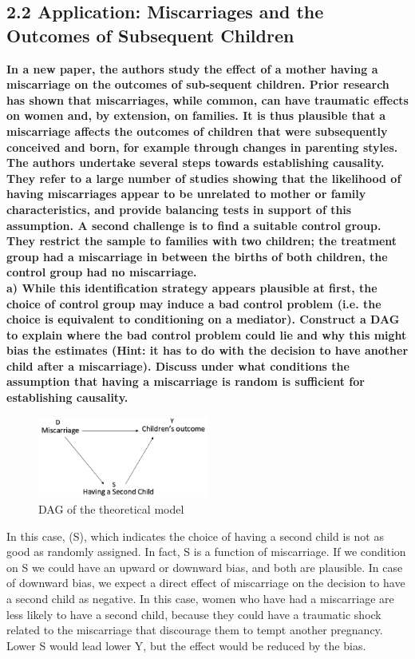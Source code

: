 \documentclass[a4paper,12pt,oneside,English]{article}
\begin{document}
\subsection{2.2  Application: Miscarriages and the Outcomes of Subsequent Children}
\textbf{In a new paper, the authors study the effect of a mother having a miscarriage on the outcomes of sub-sequent children. Prior research has shown that miscarriages, while common, can have traumatic effects on women and, by extension, on families. It is thus plausible that a miscarriage affects the outcomes of children that were subsequently conceived and born, for example through changes in parenting styles.
The authors undertake several steps towards establishing causality. They refer to a large number of studies showing that the likelihood of having miscarriages appear to be unrelated to mother or family characteristics, and provide balancing tests in support of this assumption. A second challenge is to find a suitable control group. They restrict the sample to families with two children; the treatment group had a miscarriage in between the births of both children, the control group had no miscarriage.}\\
\textbf{a) While this identification strategy appears plausible at first, the choice of control group may induce a bad control problem (i.e. the choice is equivalent to conditioning on a mediator). Construct a DAG to explain where the bad control problem could lie and why this might bias the estimates (Hint: it has to do with the decision to have another child after a miscarriage). Discuss under what conditions the assumption that having a miscarriage is random is sufficient for establishing causality.}\\

\begin{figure}[h!]
    \centering
    \includegraphics[width=0.5\textwidth]{Figure 2_2A1.png}
    \caption{DAG of the theoretical model}
    \label{fig 3}
\end{figure}
In this case, (S), which indicates the choice of having a second child is not as good as randomly assigned. In fact, S is a function of miscarriage. If we condition on S we could have an upward or downward bias, and both are plausible. In case of downward bias, we expect a direct effect of miscarriage on the decision to have a second child as negative. In this case, women who have had a miscarriage are less likely to have a second child, because they could have a traumatic shock related to the miscarriage that discourage them to tempt another pregnancy. Lower S would lead lower Y, but the effect would be reduced by the bias. 
\end{document}
